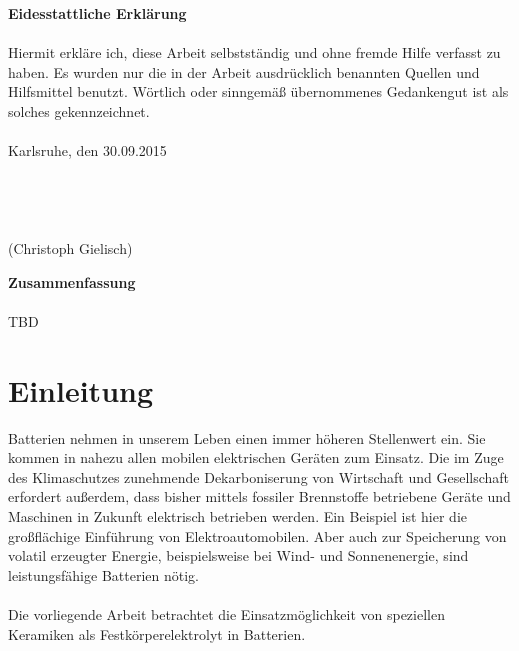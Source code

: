 \documentclass[a4paper, 11pt, headsepline,footsepline,twoside,abstract]{scrbook}
\begin{document}
\cleardoubleemptypage
\setcounter{page}{1}
\textbf{\Large{Eidesstattliche Erklärung}}
\\\\
Hiermit erkläre ich, diese Arbeit selbstständig und ohne fremde Hilfe verfasst zu haben. Es wurden nur die in der Arbeit ausdrücklich benannten Quellen und Hilfsmittel benutzt. Wörtlich oder sinngemäß übernommenes Gedankengut ist als solches gekennzeichnet.
\\\\
Karlsruhe, den 30.09.2015
\\\\
\\\\
\\
(Christoph Gielisch) 
 
\newpage

\setcounter{page}{1}
\textbf{\Large{Zusammenfassung}}
\\\\
TBD
\pagestyle{toc}
\renewcommand*{\chapterpagestyle}{toc} %
\tableofcontents
{} 
\newpage
\cleardoubleemptypage
\pagestyle{normal}
\renewcommand*{\chapterpagestyle}{plain}
\setcounter{page}{1}
\chapter{Einleitung}
Batterien nehmen in unserem Leben einen immer höheren Stellenwert ein. Sie kommen in nahezu allen mobilen elektrischen Geräten zum Einsatz. Die im Zuge des Klimaschutzes zunehmende Dekarboniserung von Wirtschaft und Gesellschaft erfordert außerdem, dass bisher mittels fossiler Brennstoffe betriebene Geräte und Maschinen in Zukunft elektrisch betrieben werden. Ein Beispiel ist hier die großflächige Einführung von Elektroautomobilen. Aber auch zur Speicherung von volatil erzeugter Energie, beispielsweise bei Wind- und Sonnenenergie, sind leistungsfähige Batterien nötig.
\\\\
Die vorliegende Arbeit betrachtet die Einsatzmöglichkeit von speziellen Keramiken als Festkörperelektrolyt in Batterien.
\end{document}
